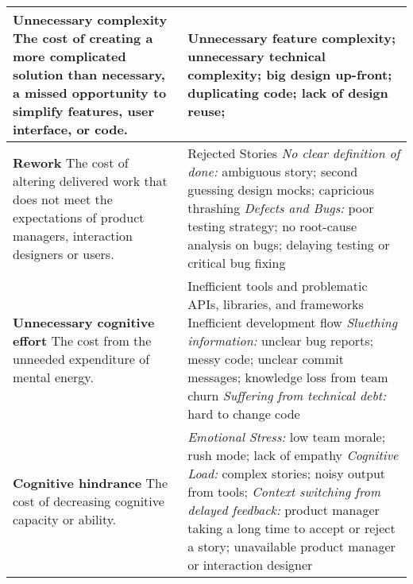 \begin{table*}[htbp]
\begin{tabular}{|p{2.5in}|p{3.6in}|}
\textbf{Unnecessary complexity} \newline The cost of creating a more complicated solution than necessary,  a missed opportunity to simplify features, user interface, or code.      & Unnecessary feature complexity; unnecessary technical complexity; big design up-front; duplicating code; lack of design reuse;                                                                                                                                                                                                                                                                                                                 \\ \hline
\textbf{Rework } \newline The cost of altering delivered work that does not meet the expectations of product managers, interaction designers or users.    & Rejected Stories \newline \textit{No clear definition of done:} ambiguous story; second guessing design mocks; capricious thrashing \newline \textit{Defects and Bugs:} poor testing strategy; no root-cause analysis on bugs; delaying testing or critical bug fixing                                                                                                                                                                    \\ \hline
\textbf{Unnecessary cognitive effort} \newline   The cost from the unneeded expenditure of mental energy.                                                                                                                 & Inefficient tools and problematic APIs, libraries, and frameworks  \newline Inefficient development flow \newline \textit{Sluething information:} unclear bug reports; messy code; unclear commit messages; knowledge loss from team churn \newline\textit{Suffering from technical debt:} hard to change code
                                                                     \\ \hline
\textbf{Cognitive hindrance} \newline The cost of decreasing cognitive capacity or ability.                        & \textit{Emotional Stress:} low team morale; rush mode; lack of empathy \newline \textit{Cognitive Load:} complex stories; noisy output from tools; \newline \textit{Context switching from delayed feedback:} product manager taking a long time to accept or reject a story; unavailable product manager or interaction designer                                                                                                                                                        \\ \hline

\end{tabular}
\end{table*}
